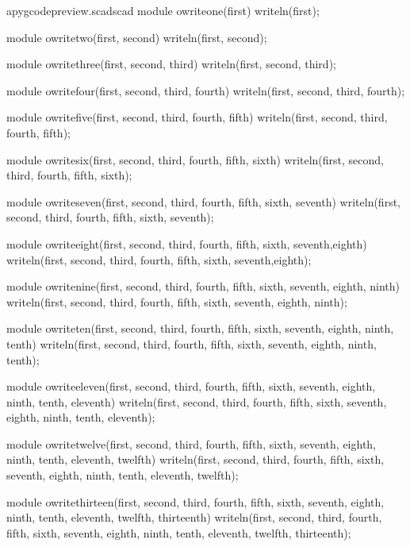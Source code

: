 \documentclass{ltxdoc}
\begin{document}
\lstset{firstnumber=\thepyscad}
\begin{writecode}{a}{pygcodepreview.scad}{scad}
module owriteone(first) {
    writeln(first);
}

module owritetwo(first, second) {
    writeln(first, second);
}

module owritethree(first, second, third) {
    writeln(first, second, third);
}

module owritefour(first, second, third, fourth) {
    writeln(first, second, third, fourth);
}

module owritefive(first, second, third, fourth, fifth) {
    writeln(first, second, third, fourth, fifth);
}

module owritesix(first, second, third, fourth, fifth, sixth) {
    writeln(first, second, third, fourth, fifth, sixth);
}

module owriteseven(first, second, third, fourth, fifth, sixth, seventh) {
    writeln(first, second, third, fourth, fifth, sixth, seventh);
}

module owriteeight(first, second, third, fourth, fifth, sixth, seventh,eighth) {
    writeln(first, second, third, fourth, fifth, sixth, seventh,eighth);
}

module owritenine(first, second, third, fourth, fifth, sixth, seventh, eighth, ninth) {
    writeln(first, second, third, fourth, fifth, sixth, seventh, eighth, ninth);
}

module owriteten(first, second, third, fourth, fifth, sixth, seventh, eighth, ninth, tenth) {
    writeln(first, second, third, fourth, fifth, sixth, seventh, eighth, ninth, tenth);
}

module owriteeleven(first, second, third, fourth, fifth, sixth, seventh, eighth, ninth, tenth, eleventh) {
    writeln(first, second, third, fourth, fifth, sixth, seventh, eighth, ninth, tenth, eleventh);
}

module owritetwelve(first, second, third, fourth, fifth, sixth, seventh, eighth, ninth, tenth, eleventh, twelfth) {
    writeln(first, second, third, fourth, fifth, sixth, seventh, eighth, ninth, tenth, eleventh, twelfth);
}

module owritethirteen(first, second, third, fourth, fifth, sixth, seventh, eighth, ninth, tenth, eleventh, twelfth, thirteenth) {
    writeln(first, second, third, fourth, fifth, sixth, seventh, eighth, ninth, tenth, eleventh, twelfth, thirteenth);
}

\end{writecode}
\addtocounter{pyscad}{52}
 
\end{document}
